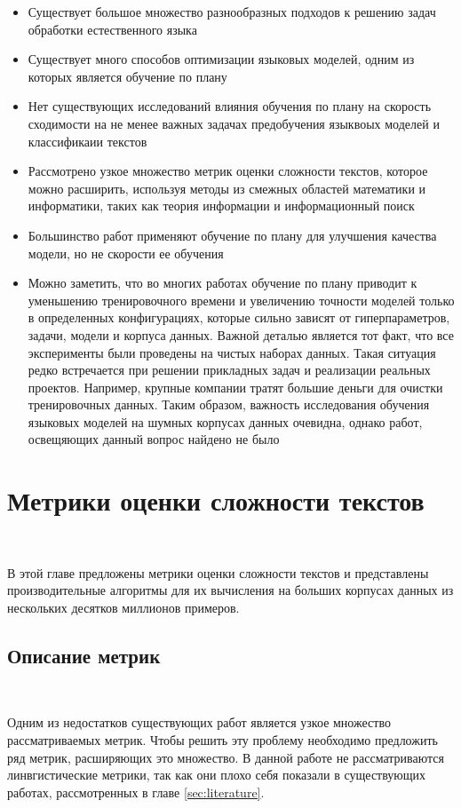 \documentclass{spbau-diploma}
\begin{document}
\begin{itemize}
	\item Существует большое множество разнообразных подходов к решению задач обработки естественного языка
	\item Существует много способов оптимизации языковых моделей, одним из которых является обучение по плану
	\item Нет существующих исследований влияния обучения по плану на скорость сходимости на не менее важных задачах предобучения языквоых моделей и классификаии текстов
	\item Рассмотрено узкое множество метрик оценки сложности текстов, которое можно расширить, используя методы из смежных областей математики и информатики, таких как теория информации и информационный поиск
	\item Большинство работ применяют обучение по плану для улучшения качества модели, но не скорости ее обучения
	\item Можно заметить, что во многих работах обучение по плану приводит к уменьшению тренировочного времени и увеличению точности моделей только в определенных конфигурациях, которые сильно зависят от гиперпараметров, задачи, модели и корпуса данных. Важной деталью является тот факт, что все эксперименты были проведены на чистых наборах данных. Такая ситуация редко встречается при решении прикладных задач и реализации реальных проектов. Например, крупные компании тратят большие деньги для очистки тренировочных данных. Таким образом, важность исследования обучения языковых моделей на шумных корпусах данных очевидна, однако работ, освещяющих данный вопрос найдено не было
\end{itemize}

\section{Метрики оценки сложности текстов} \label{sec:metrics}
\ 

В этой главе предложены метрики оценки сложности текстов и представлены производительные алгоритмы для их вычисления на больших корпусах данных из нескольких десятков миллионов примеров.

\subsection{Описание метрик}
\ 

Одним из недостатков существующих работ является узкое множество рассматриваемых метрик. Чтобы решить эту проблему необходимо предложить ряд метрик, расширяющих это множество. В данной работе не рассматриваются линвгистические метрики, так как они плохо себя показали в существующих работах, рассмотренных в главе \ref{sec:literature}.
\end{document}
